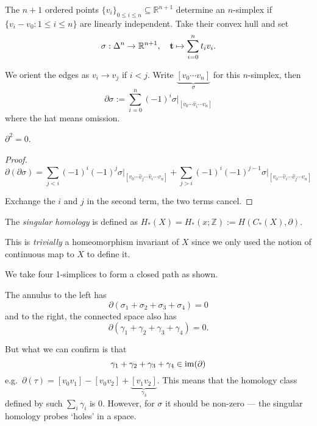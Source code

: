 \documentclass[a4paper,11pt]{article}
\begin{document}
	\begin{nt}
		The $n+1$ ordered points $\{v_i\}_{0 \leq i \leq n} \subseteq \mathbb{R}^{n+1}$ determine an $n$-simplex if $\{v_i - v_0 : 1 \leq i \leq n\}$ are linearly independent. Take their convex hull and set 
		\[
			\sigma: \Delta^n \to \mathbb{R}^{n+1}, \quad \vb t \mapsto \sum_{i=0}^n t_i v_i.
		\]
		
		We orient the edges as $v_i \to v_j$ if $i < j$. Write $\underbrace{[v_0 \cdots v_n]}_{\sigma}$ for this $n$-simplex, then
		\[
			\partial \sigma := \sum_{i=0}^n (-1)^i \sigma\bigg|_{[v_0 \cdots \hat{v}_i \cdots v_n]}
		\]
		where the hat means omission.
	\end{nt}


	\begin{lem}
		$\partial^2=0$.
	\end{lem}

	\begin{proof}
		\[
			\partial (\partial \sigma) = \sum_{j<i} (-1)^i (-1)^j \sigma\bigg|_{[v_0 \cdots \hat{v}_j \cdots \hat{v}_i \cdots v_n]} + \sum_{j>i} (-1)^i (-1)^{j-1} \sigma\bigg|_{[v_0 \cdots \hat{v}_i \cdots \hat{v}_j \cdots v_n]}
		\]
		
		Exchange the $i$ and $j$ in the second term, the two terms cancel.
	\end{proof}

	\begin{defi}
		The \emph{singular homology} is defined as $H_*(X) = H_*(x; \mathbb{Z}):= H(C_*(X),\partial)$.
	\end{defi}
	\begin{nt}
		This is \emph{trivially} a homeomorphism invariant of $X$ since we only used the notion of continuous map to $X$ to define it.
	\end{nt}

	\begin{ex}

		We take four 1-simplices to form a closed path as shown.

		The annulus to the left has 
		\[
			\partial(\sigma_1 + \sigma_2 + \sigma_3 + \sigma_4) = 0
		\]
		and to the right, the connected space also has
		\[
			\partial(\gamma_1 + \gamma_2 + \gamma_3 + \gamma_4) = 0.
		\]
		
		But what we can confirm is that 
		\[
			\gamma_1 + \gamma_2 + \gamma_3 + \gamma_4 \in \operatorname{im}(\partial)
		\]
		e.g.\ $\partial(\tau) = [v_0 v_1]-[v_0 v_2] + \underbrace{[v_1 v_2]}_{\gamma_3}$. This means that the homology class defined by such $\sum_i \gamma_i$ is 0. However, for $\sigma$ it should be non-zero --- the singular homology probes `holes' in a space.
	\end{ex}
\end{document}
